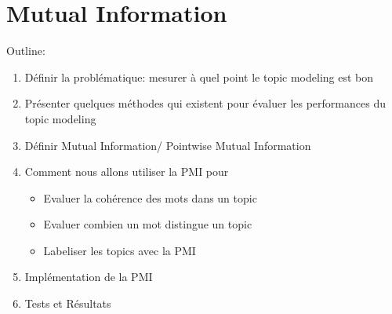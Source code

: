 \section{Mutual Information}

Outline: 

\begin{enumerate}
\item Définir la problématique: mesurer à quel point le topic modeling est bon

\item Présenter quelques méthodes qui existent pour évaluer les performances du topic modeling

\item Définir Mutual Information/ Pointwise Mutual Information

\item Comment nous allons utiliser la PMI pour 
	\begin{itemize}
		\item Evaluer la cohérence des mots dans un topic
		\item Evaluer combien un mot distingue un topic
		\item Labeliser les topics avec la PMI
	\end{itemize}

\item Implémentation de la PMI
\item Tests et Résultats 
	
\end{enumerate}
